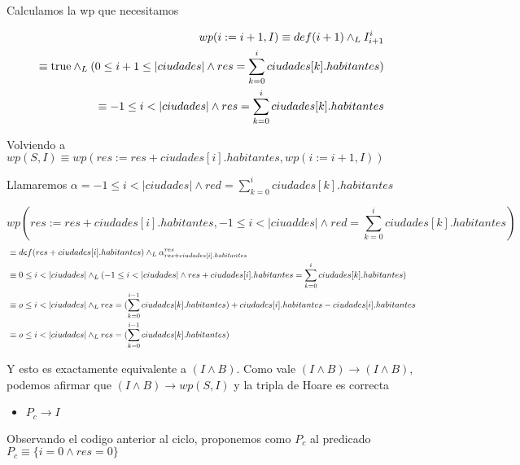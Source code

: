 \documentclass[10pt,a4paper]{article}
\begin{document}
\begin {enumerate}
    Calculamos la wp que necesitamos

    \begin{align*}
        wp (i := i + 1, I) \equiv def(i + 1) \land _L I_{i +1}^{i} \\
        \equiv \mathrm{true} \land _L (0 \leq i + 1 \leq |ciudades| \land res = \sum\limits_{k=0}^{i}{ciudades[k].habitantes}) \\
        \equiv -1 \leq i < |ciudades| \land res =  \sum\limits_{k=0}^{i}{ciudades[k].habitantes} 
    \end{align*}

    Volviendo a $wp(S, I) \equiv wp(res := res + ciudades[i].habitantes, wp(i := i + 1, I))$

    Llamaremos $\alpha = -1 \leq i < |ciudades| \land red =  \sum\limits_{k=0}^{i}{ciudades[k].habitantes} $

    $$ wp(res := res + ciudades[i].habitantes, -1 \leq i < |ciuaddes| \land red =  \sum\limits_{k=0}^{i}{ciudades[k].habitantes}) $$
    \begin{align*}
        &\equiv def(res + ciudades[i].habitantes) \land _L \alpha_{res + ciudades[i].habitantes}^{res} \\
        &\equiv 0 \leq i < |ciudades| \land _L (-1 \leq i < |ciudades| \land res + ciudades[i].habitantes = \sum\limits_{k=0}^{i}{ciudades[k].habitantes} ) \\
        &\equiv o \leq i < |ciudades| \land _L res = (\sum\limits_{k=0}^{i - 1}{ciudades[k].habitantes}) + ciudades[i].habitantes - ciudades[i].habitantes \\
        &\equiv o \leq i < |ciudades| \land _L res = (\sum\limits_{k=0}^{i - 1}{ciudades[k].habitantes})  \\
    \end{align*}

    Y esto es exactamente equivalente a $(I \land B)$. Como vale $(I \land B) \to (I \land B)$, podemos afirmar que $(I \land B) \to wp(S, I)$ y la tripla de Hoare es correcta


    \begin{itemize}
        \item $ P_{c} \to I$
        \end{itemize}

    Observando el codigo anterior al ciclo, proponemos como $P_{c}$ al predicado $P_{c} \equiv \{i = 0 \land res = 0\}$


\end{enumerate}
\end{document}
